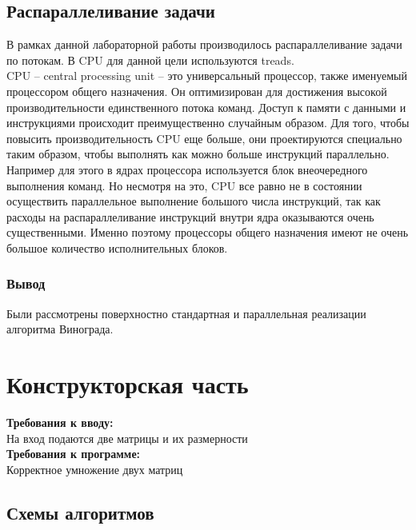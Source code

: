 \documentclass[12pt]{report}
\begin{document}
\section{Распараллеливание задачи}
В рамках данной лабораторной работы производилось распараллеливание задачи по потокам. В CPU для данной цели используются treads.  \\
	
	CPU – central processing unit – это универсальный процессор, также именуемый процессором общего назначения. Он оптимизирован для достижения высокой производительности единственного потока команд. Доступ к памяти с данными и инструкциями происходит преимущественно случайным образом.
Для того, чтобы повысить производительность CPU еще больше, они проектируются специально таким образом, чтобы выполнять как можно больше инструкций параллельно. Например для этого в ядрах процессора используется блок внеочередного выполнения команд.	
Но несмотря на это, CPU все равно не в состоянии осуществить параллельное выполнение большого числа инструкций, так как расходы на распараллеливание инструкций внутри ядра оказываются очень существенными. Именно поэтому процессоры общего назначения имеют не очень большое количество исполнительных блоков.


\subsection{Вывод}
Были рассмотрены поверхностно стандартная и параллельная реализации алгоритма Винограда.


\chapter{Конструкторская часть}
\textbf{Требования к вводу:}\\
На вход подаются две матрицы и их размерности\\
\textbf{Требования к программе:}\\
Корректное умножение двух матриц \\


\section{Схемы алгоритмов}
\end{document}
